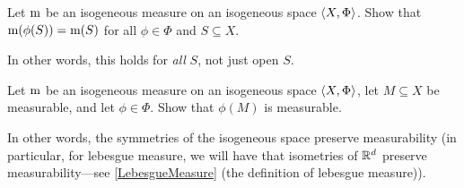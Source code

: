 \begin{exr}
Let $\mathrm{m}$ be an isogeneous measure on an isogeneous space $\langle X,\Phi\rangle$.  Show that $\mathrm{m} (\phi (S))=\mathrm{m} (S)$ for all $\phi \in \Phi$ and $S\subseteq X$.
\begin{rmk}
In other words, this holds for \emph{all} $S$, not just open $S$.
\end{rmk}
\end{exr}
\begin{exr}
Let $\mathrm{m}$ be an isogeneous measure on an isogeneous space $\langle X,\Phi\rangle$, let $M\subseteq X$ be measurable, and let $\phi \in \Phi$.  Show that $\phi (M)$ is measurable.
\begin{rmk}
In other words, the symmetries of the isogeneous space preserve measurability (in particular, for lebesgue measure, we will have that isometries of $\mathbb{R} ^d$ preserve measurability---see \cref{LebesgueMeasure} (the definition of lebesgue measure)).
\end{rmk}
\end{exr}

